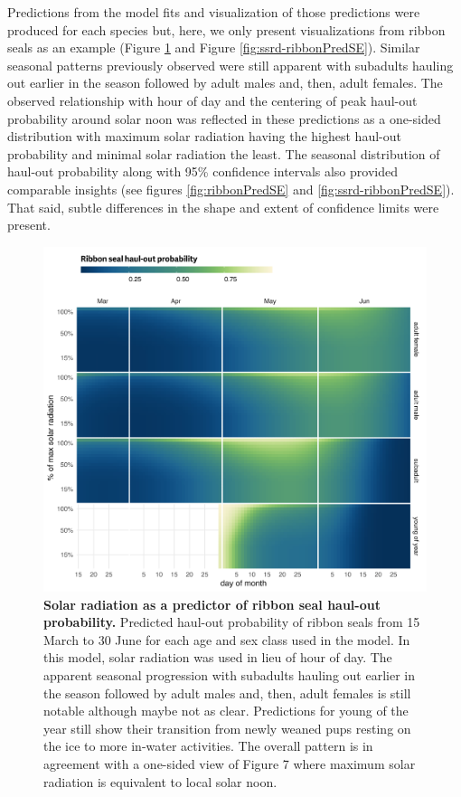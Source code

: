 \documentclass[fleqn,10pt,lineno]{wlpeerj} %
\begin{document}
Predictions from the model fits and visualization of those predictions were
produced for each species but, here, we only present visualizations from
ribbon seals as an example (Figure \ref{fig:ssrd-prediction-heatmap} and Figure
\ref{fig:ssrd-ribbonPredSE}). Similar seasonal patterns previously observed were
still apparent with subadults hauling out earlier in the season followed by
adult males and, then, adult females. The observed relationship with hour of
day and the centering of peak haul-out probability around solar noon was
reflected in these predictions as a one-sided distribution with maximum solar
radiation having the highest haul-out probability and minimal solar radiation
the least. The seasonal distribution of haul-out probability along with 95\%
confidence intervals also provided comparable insights (see figures
\ref{fig:ribbonPredSE} and \ref{fig:ssrd-ribbonPredSE}). That said, subtle
differences in the shape and extent of confidence limits were present.



\begin{figure}
\includegraphics[width=1\linewidth]{../figures/ssrd-prediction-heatmap-1} \caption{\textbf{Solar radiation as a predictor of ribbon seal haul-out probability.} \linebreak Predicted haul-out probability of ribbon seals from 15 March to 30 June for each age and sex class used in the model. In this model, solar radiation was used in lieu of hour of day. The apparent seasonal progression with subadults hauling out earlier in the season followed by adult males and, then, adult females is still notable although maybe not as clear. Predictions for young of the year still show their transition from newly weaned pups resting on the ice to more in-water activities. The overall pattern is in agreement with a one-sided view of Figure 7 where maximum solar radiation is equivalent to local solar noon.}\label{fig:ssrd-prediction-heatmap}
\end{figure}
\end{document}
